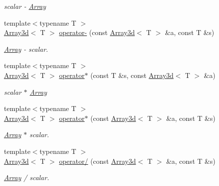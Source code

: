 \begin{DoxyCompactItemize}
\begin{DoxyCompactList}\small\item\em scalar -\/ \mbox{\hyperlink{classXMLArray_1_1Array}{Array}} \end{DoxyCompactList}\item 
{\footnotesize template$<$typename T $>$ }\\\mbox{\hyperlink{classXMLArray_1_1Array3d}{Array3d}}$<$ T $>$ \mbox{\hyperlink{namespaceXMLArray_a87b6f705aa4d225a13f5d6857be44459}{operator-\/}} (const \mbox{\hyperlink{classXMLArray_1_1Array3d}{Array3d}}$<$ T $>$ \&a, const T \&s)
\begin{DoxyCompactList}\small\item\em \mbox{\hyperlink{classXMLArray_1_1Array}{Array}} -\/ scalar. \end{DoxyCompactList}\item 
{\footnotesize template$<$typename T $>$ }\\\mbox{\hyperlink{classXMLArray_1_1Array3d}{Array3d}}$<$ T $>$ \mbox{\hyperlink{namespaceXMLArray_a09c6c9bdce753a6c7ccd4efbdda02e23}{operator$\ast$}} (const T \&s, const \mbox{\hyperlink{classXMLArray_1_1Array3d}{Array3d}}$<$ T $>$ \&a)
\begin{DoxyCompactList}\small\item\em scalar $\ast$ \mbox{\hyperlink{classXMLArray_1_1Array}{Array}} \end{DoxyCompactList}\item 
{\footnotesize template$<$typename T $>$ }\\\mbox{\hyperlink{classXMLArray_1_1Array3d}{Array3d}}$<$ T $>$ \mbox{\hyperlink{namespaceXMLArray_a6e9dd6864853158f18b5f406e398c570}{operator$\ast$}} (const \mbox{\hyperlink{classXMLArray_1_1Array3d}{Array3d}}$<$ T $>$ \&a, const T \&s)
\begin{DoxyCompactList}\small\item\em \mbox{\hyperlink{classXMLArray_1_1Array}{Array}} $\ast$ scalar. \end{DoxyCompactList}\item 
{\footnotesize template$<$typename T $>$ }\\\mbox{\hyperlink{classXMLArray_1_1Array3d}{Array3d}}$<$ T $>$ \mbox{\hyperlink{namespaceXMLArray_af90bb7d526be91f27f5ae1bdf5bd5a44}{operator/}} (const \mbox{\hyperlink{classXMLArray_1_1Array3d}{Array3d}}$<$ T $>$ \&a, const T \&s)
\begin{DoxyCompactList}\small\item\em \mbox{\hyperlink{classXMLArray_1_1Array}{Array}} / scalar. \end{DoxyCompactList}\item 

\end{DoxyCompactItemize}
